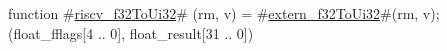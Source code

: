 function #\hyperref[sailRISCVzriscvzyf32ToUi32]{riscv\_f32ToUi32}# (rm, v) = {
  #\hyperref[sailRISCVzexternzyf32ToUi32]{extern\_f32ToUi32}#(rm, v);
  (float_fflags[4 .. 0], float_result[31 .. 0])
}
